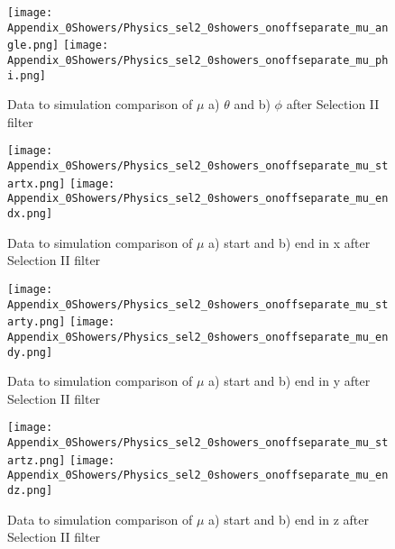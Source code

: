 \documentclass{article}
\begin{document}
\begin{figure}[h!]
\centering
\texttt{[image: Appendix\_0Showers/Physics\_sel2\_0showers\_onoffseparate\_mu\_angle.png]}
\hspace{2 mm}
\texttt{[image: Appendix\_0Showers/Physics\_sel2\_0showers\_onoffseparate\_mu\_phi.png]}
\caption{ Data to simulation comparison of $\mu$ a) $\theta$  and b) $\phi$ after Selection II filter }
\label{fig:physics_sel2_0shower_muphi}
\end{figure}

\begin{figure}[h!]
\centering
\texttt{[image: Appendix\_0Showers/Physics\_sel2\_0showers\_onoffseparate\_mu\_startx.png]}
\texttt{[image: Appendix\_0Showers/Physics\_sel2\_0showers\_onoffseparate\_mu\_endx.png]}
\caption{ Data to simulation comparison of $\mu$ a) start and b) end in x after Selection II filter }
\label{fig:physics_sel2_0shower_x}
\end{figure}

\begin{figure}[h!]
\centering
\texttt{[image: Appendix\_0Showers/Physics\_sel2\_0showers\_onoffseparate\_mu\_starty.png]}
\texttt{[image: Appendix\_0Showers/Physics\_sel2\_0showers\_onoffseparate\_mu\_endy.png]}
\caption{ Data to simulation comparison of $\mu$ a) start and b) end in y after Selection II filter }
\label{fig:physics_sel2_0shower_y}
\end{figure}

\begin{figure}[h!]
\centering
\texttt{[image: Appendix\_0Showers/Physics\_sel2\_0showers\_onoffseparate\_mu\_startz.png]}
\texttt{[image: Appendix\_0Showers/Physics\_sel2\_0showers\_onoffseparate\_mu\_endz.png]}
\caption{ Data to simulation comparison of $\mu$ a) start and b) end in z after Selection II filter }
\label{fig:physics_sel2_0shower_z}
\end{figure}

\end{document}
